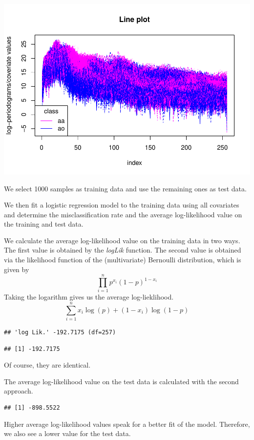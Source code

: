 \documentclass[
]{article}
\begin{document}
\includegraphics{A2_files/figure-latex/unnamed-chunk-20-1.pdf}

We select 1000 samples as training data and use the remaining ones as
test data.

We then fit a logistic regression model to the training data using all
covariates and determine the misclassification rate and the average
log-likelihood value on the training and test data.

We calculate the average log-likelihood value on the training data in
two ways. The first value is obtained by the \textit{logLik} function.
The second value is obtained via the likelihood function of the
(multivariate) Bernoulli distribution, which is given by
\[\prod_{i=1}^n p^{x_i}(1-p)^{1-x_i}\] Taking the logarithm gives us the
average log-lieklihood. \[ \sum_{i=1}^n x_i \log(p)+(1-x_i)\log(1-p) \]

\begin{verbatim}
## 'log Lik.' -192.7175 (df=257)
\end{verbatim}

\begin{verbatim}
## [1] -192.7175
\end{verbatim}

Of course, they are identical.

The average log-likelihood value on the test data is calculated with the
second approach.

\begin{verbatim}
## [1] -898.5522
\end{verbatim}

Higher average log-likelihood values speak for a better fit of the
model. Therefore, we also see a lower value for the test data.
\end{document}
